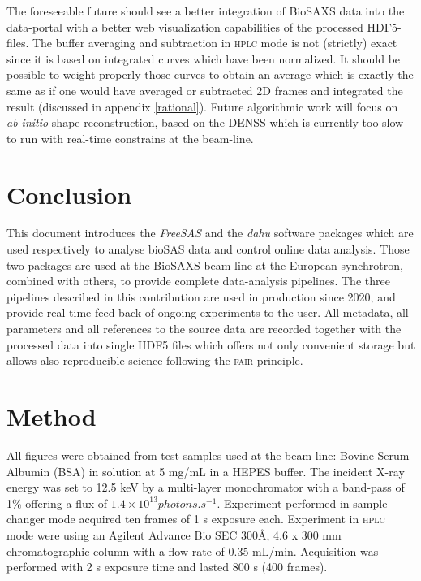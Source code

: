 \documentclass[preprint]{iucr}              %
\begin{document}
The foreseeable future should see a better integration of BioSAXS data into the data-portal with a better web visualization capabilities of the processed HDF5-files. 
The buffer averaging and subtraction in \textsc{hplc} mode is not (strictly) exact since it is based on integrated curves which have been normalized.
It should be possible to weight properly those curves to obtain an average which is exactly the same as if one would have averaged or subtracted 2D frames and integrated the result (discussed in appendix \ref{rational}).
Future algorithmic work will focus on \textit{ab-initio} shape reconstruction, based on the DENSS \cite{denss} which is currently too slow to run with real-time constrains at the beam-line.

\section{Conclusion}

This document introduces the \textit{FreeSAS} and the \textit{dahu} software packages which are used respectively to analyse bioSAS data and control online data analysis.
Those two packages are used at the BioSAXS beam-line at the European synchrotron, combined with others, to provide complete data-analysis pipelines.
The three pipelines described in this contribution are used in production since 2020, and provide real-time feed-back of ongoing experiments to the user.
All metadata, all parameters and all references to the source data are recorded together with the processed data into single HDF5 files which offers 
not only convenient storage but allows also reproducible science following the \textsc{fair} principle. 

\appendix
\section{Method}

All figures were obtained from test-samples used at the beam-line: Bovine Serum Albumin (BSA) in solution at 5 mg/mL in a HEPES buffer.
The incident X-ray energy was set to 12.5 keV by a multi-layer monochromator with a band-pass of 1\% offering a flux of $1.4\times 10^{13} photons.s^{-1}$.
Experiment performed in sample-changer mode acquired ten frames of 1 s exposure each.
Experiment in \textsc{hplc} mode were using an Agilent Advance Bio SEC 300Å, 4.6 x 300 mm chromatographic column with a flow rate of 0.35 mL/min.
Acquisition was performed with 2 s exposure time and lasted 800 s (400 frames). 
\end{document}
